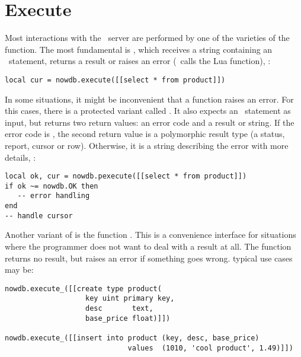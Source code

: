 
\section{Execute}
Most interactions with the \nowdb\ server
are performed by one of the varieties of
the  function.
The most fundamental is ,
which receives a string containing an \sql\ statement,
returns a result or raises an error (\ie\ calls
the Lua  function), \eg:

\begin{lua}
\begin{lstlisting}
local cur = nowdb.execute([[select * from product]])
\end{lstlisting}
\end{lua}

In some situations, it might be inconvenient
that a function raises an error.
For this cases, there is a protected
variant called .
It also expects an \sql\ statement
as input, but returns two return values:
an error code and a result or string.
If the error code is ,
the second return value
is a polymorphic result type
(a status, report, cursor or row).
Otherwise, it is a string describing
the error with more details, \eg:

\begin{lua}
\begin{lstlisting}
local ok, cur = nowdb.pexecute([[select * from product]])
if ok ~= nowdb.OK then
   -- error handling
end
-- handle cursor
\end{lstlisting}
\end{lua}

Another variant of  is
the function .
This is a convenience interface for
situations where the programmer does
not want to deal with a result at all.
The function returns no result, but
raises an error if something goes wrong.
typical use cases may be:

\begin{lua}
\begin{lstlisting}
nowdb.execute_([[create type product(
                   key uint primary key,
                   desc       text,
                   base_price float)]])

nowdb.execute_([[insert into product (key, desc, base_price)
                             values  (1010, 'cool product', 1.49)]])
\end{lstlisting}
\end{lua}

